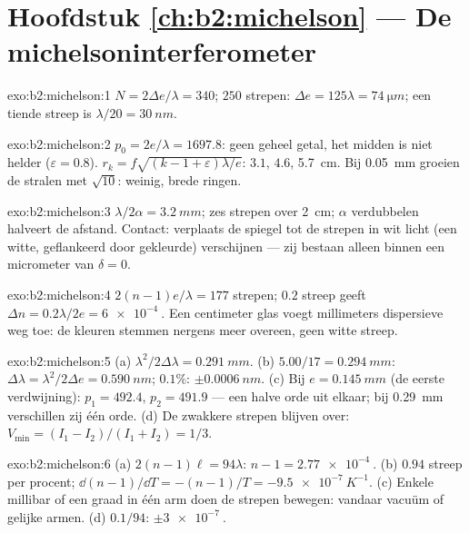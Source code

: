 \section*{Hoofdstuk \ref{ch:b2:michelson} --- De michelsoninterferometer}

\begin{solution}{exo:b2:michelson:1}
$N = 2\Delta e/\lambda = 340$; $250$ strepen:
$\Delta e = 125\lambda = \qty{74}{\micro m}$; een tiende
streep is $\lambda/20 = \qty{30}{nm}$.
\end{solution}

\begin{solution}{exo:b2:michelson:2}
$p_0 = 2e/\lambda = 1697.8$: geen geheel getal, het midden is niet helder
($\varepsilon =
0.8$). $r_k = f\sqrt{(k - 1 + \varepsilon)\lambda/e}$:
$3.1$, $4.6$, \qty{5.7}{cm}. Bij \qty{0.05}{mm} groeien de
stralen met $\sqrt{10}$: weinig, brede ringen.
\end{solution}

\begin{solution}{exo:b2:michelson:3}
$\lambda/2\alpha = \qty{3.2}{mm}$; zes strepen over \qty{2}{cm}; $\alpha$
verdubbelen halveert de
afstand. Contact: verplaats de spiegel tot de strepen in wit licht
(een witte, geflankeerd door gekleurde) verschijnen --- zij bestaan alleen binnen
een micrometer van $\delta = 0$.
\end{solution}

\begin{solution}{exo:b2:michelson:4}
$2(n - 1)e/\lambda = 177$ strepen; $0.2$ streep geeft
$\Delta n = 0.2\lambda/2e = \qty{6e-4}{}$.
Een centimeter glas voegt millimeters dispersieve weg toe: de kleuren
stemmen nergens meer overeen, geen witte streep.
\end{solution}

\begin{solution}{exo:b2:michelson:5}
(a) $\lambda^2/2\Delta\lambda = \qty{0.291}{mm}$. (b)
$5.00/17 = \qty{0.294}{mm}$:
$\Delta\lambda = \lambda^2/2\Delta e =
\qty{0.590}{nm}$; $0.1\%$:
$\pm\qty{0.0006}{nm}$. (c) Bij $e = \qty{0.145}{mm}$ (de eerste
verdwijning): $p_1 = 492.4$, $p_2 = 491.9$ --- een halve orde uit elkaar; bij
\qty{0.29}{mm} verschillen zij één orde. (d) De zwakkere strepen blijven
over: $V_{\min} =
(I_1 - I_2)/(I_1 + I_2) = 1/3$.
\end{solution}

\begin{solution}{exo:b2:michelson:6}
(a) $2(n - 1)\ell = 94\lambda$: $n - 1 = \qty{2.77e-4}{}$. (b) $0.94$ streep
per procent;
$\dd(n - 1)/\dd T = -(n - 1)/T = \qty{-9.5e-7}{K^{-1}}$. (c) Enkele millibar of een
graad in één arm doen de strepen bewegen: vandaar vacuüm of gelijke armen. (d)
$0.1/94$: $\pm\qty{3e-7}{}$.
\end{solution}


